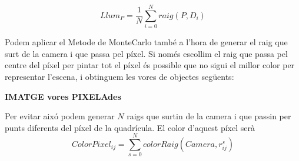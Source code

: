 \documentclass{article}
\begin{document}
\begin{equation}
   Llum_P= \frac{1}{N}\sum_{i=0}^{N} raig(P, D_i)
\end{equation}



Podem aplicar el Metode de MonteCarlo també a l'hora de generar el raig que surt de la camera i que passa pel píxel. Si només
escollim el raig que passa pel centre del píxel per pintar tot el píxel és possible que no sigui el millor color per representar
l'escena, i obtinguem les vores de objectes següents: 


\textbf{IMATGE vores PIXELAdes} 



Per evitar aixó podem generar $N$ raigs que surtin de la camera i que passin per punts diferents del píxel de la quadrícula. El
color d'aquest píxel serà
\begin{equation}
   ColorPixel_{ij}= \sum_{s=0}^N colorRaig(Camera,r^s_{ij})
\end{equation}
\end{document}
